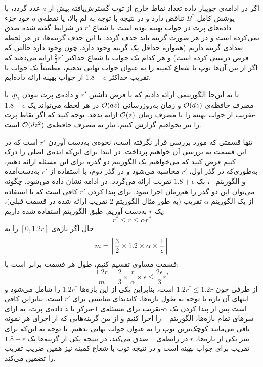 اگر در ادامه‌ی جویبار داده تعداد نقاط خارج از توپ گسترش‌یافته بیش از $z$ عدد گردد، با پوشش کامل $B^*$ تناقض دارد و در نتیجه با توجه به لم بالا، یا نقطه‌ی $q$ خود جزء داده‌های پرت در جواب بهینه بوده است یا شعاع $r'$ در شرایط گفته شده صدق نمی‌کرده است و در هر صورت گزینه باید حذف گردد.
با این حذف گزینه‌ها، در هر لحظه تعدادی گزینه داریم (همواره حداقل یک گزینه وجود دارد، چون وجود دارد حالتی که فرض درستی کرده است) و هر کدام یک جواب با شعاع حداکثر $\frac{3}{2}r'$ ارائه می‌دهند که اگر از بین آن‌ها توپ با شعاع کمینه را به عنوان جواب نهایی بدهیم، مطمئناً یک جواب با تقریب حداکثر $1.8 + \epsilon$ از جواب بهینه ارائه داده‌ایم.

تا به این‌جا الگوریتمی ارائه دادیم که با فرض داشتن $r'$ و داده‌ی پرت نبودن $p_1$، با مصرف حافظه‌ی $\mathcal{O}(dz)$ و زمان به‌روزرسانی $\mathcal{O}(dz)$ در هر لحظه می‌تواند یک $1.8 + \epsilon$-تقریب از جواب بهینه را با مصرف زمان $\mathcal{O}(z)$ ارائه بدهد.
توجه کنید که اگر نقاط پرت را نیز‌ بخواهیم گزارش کنیم، نیاز به مصرف حافظه‌ی $\mathcal{O}(dz^2)$ است.

تنها قسمتی که مورد بررسی قرار نگرفته است، نحوه‌ی به‌دست آوردن $r'$ است که در این قسمت به بررسی آن خواهیم پرداخت.
در ابتدا برای این‌که ایده‌ی اصلی را درک کنیم فرض کنید که می‌خواهیم یک الگوریتم دو گذره برای این مسئله ارائه دهیم، به‌طوری‌که در گذر اول، $r'$ محاسبه می‌شود و در گذر دوم، با استفاده از $r'$ به‌دست‌آمده و الگوریتم ~، یک $1.8 + \epsilon$ تقریب ارائه می‌گردد.
در ادامه نشان داده می‌شود، چگونه می‌توان این دو گذر را هم‌زمان اجرا نمود.
برای پیدا کردن $r'$ کافی است که با استفاده از یک الگوریتم $\alpha$-تقریب (به طور مثال الگوریتم $2$-تقریب ارائه شده در قسمت قبلی)، یک $r$ به‌دست آوریم.
طبق الگوریتم استفاده شده داریم:
$$r^* \leq r \leq \alpha r^*$$ 
حال اگر بازه‌ی $[0, 1.2r]$ را به 
$$m = \left\lceil{\frac{3}{2} \times 1.2 \times \alpha \times \frac{1}{\epsilon}}\right\rceil$$
 قسمت مساوی تقسیم کنیم، طول هر قسمت برابر است با:
 $$\frac{1.2  r}{m} = \frac{2}{3} \times \frac{r}{\alpha} \times \epsilon \leq \frac{2\epsilon}{3}r^*$$
 از طرفی چون $1.2r^* \leq 1.2r$ است، بنابراین یکی از این بازه‌ها $1.2r^*$ را شامل می‌شود و انتهای آن بازه با توجه به طول بازه‌ها، کاندیدای مناسبی برای $r'$ است.
 بنابراین کافی است پس از پیدا کردن یک $\alpha$-تقریب برای مسئله‌ی $1$-مرکز با $z$ داده‌ی پرت، به ازای سرهای تمام بازه‌ها، الگوریتم ~ را اجرا کنیم و از بین گزینه‌هایی که از اجرای هر نمونه باقی می‌مانند کوچک‌ترین توپ را به عنوان جواب نهایی بدهیم.
 با توجه به این‌که برای سر یکی از بازه‌ها، $r$ در رابطه‌ی ~ صدق می‌کند، در نتیجه یکی از گزینه‌ها یک $1.8 + \epsilon$-تقریب برای جواب بهینه است و در نتیجه توپ با شعاع کمینه نیز همین ضریب تقریب را تضمین می‌کند.
 
